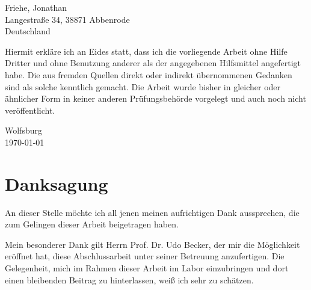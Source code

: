 \newpage




\text{ }
\vspace{2.0cm}


Friehe, Jonathan\\
Langestraße 34, 38871 Abbenrode\\
Deutschland
\vspace{1.0cm}

\glqq Hiermit erkl\"are ich an Eides statt, dass ich die vorliegende Arbeit ohne Hilfe Dritter und ohne
Benutzung anderer als der angegebenen Hilfsmittel angefertigt habe. Die aus fremden Quellen
direkt oder indirekt \"ubernommenen Gedanken sind als solche kenntlich gemacht. Die Arbeit
wurde bisher in gleicher oder \"ahnlicher Form in keiner anderen Pr\"ufungsbeh\"orde vorgelegt
und auch noch nicht ver\"offentlicht.\grqq

Wolfsburg\\
\today
\medskip
\medskip






\newpage

\setcounter{page}{3}



\chapter*{Danksagung}

An dieser Stelle möchte ich all jenen meinen aufrichtigen Dank aussprechen, die zum Gelingen dieser Arbeit beigetragen haben.

Mein besonderer Dank gilt Herrn Prof. Dr. Udo Becker, der mir die Möglichkeit eröffnet hat, diese Abschlussarbeit unter seiner Betreuung anzufertigen. Die Gelegenheit, mich im Rahmen dieser Arbeit im Labor einzubringen und dort einen bleibenden Beitrag zu hinterlassen, weiß ich sehr zu schätzen.

